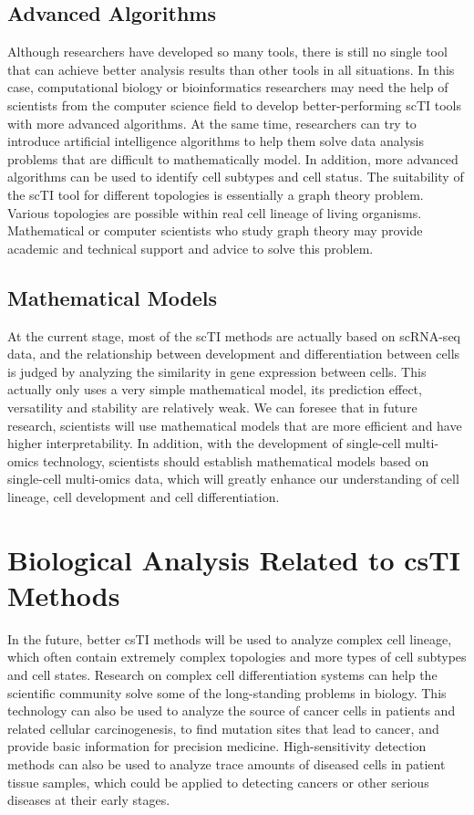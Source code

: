\subsection{Advanced Algorithms}

Although researchers have developed so many tools, there is still no single tool that can achieve better analysis results than other tools in all situations. In this case, computational biology or bioinformatics researchers may need the help of scientists from the computer science field to develop better-performing scTI tools with more advanced algorithms. At the same time, researchers can try to introduce artificial intelligence algorithms to help them solve data analysis problems that are difficult to mathematically model. In addition, more advanced algorithms can be used to identify cell subtypes and cell status. The suitability of the scTI tool for different topologies is essentially a graph theory problem. Various topologies are possible within real cell lineage of living organisms. Mathematical or computer scientists who study graph theory may provide academic and technical support and advice to solve this problem.

\subsection{Mathematical Models}

At the current stage, most of the scTI methods are actually based on scRNA-seq data, and the relationship between development and differentiation between cells is judged by analyzing the similarity in gene expression between cells. This actually only uses a very simple mathematical model, its prediction effect, versatility and stability are relatively weak. We can foresee that in future research, scientists will use mathematical models that are more efficient and have higher interpretability. In addition, with the development of single-cell multi-omics technology, scientists should establish mathematical models based on single-cell multi-omics data, which will greatly enhance our understanding of cell lineage, cell development and cell differentiation.

\section{Biological Analysis Related to csTI Methods}

In the future, better csTI methods will be used to analyze complex cell lineage, which often contain extremely complex topologies and more types of cell subtypes and cell states. Research on complex cell differentiation systems can help the scientific community solve some of the long-standing problems in biology. This technology can also be used to analyze the source of cancer cells in patients and related cellular carcinogenesis, to find mutation sites that lead to cancer, and provide basic information for precision medicine. High-sensitivity detection methods can also be used to analyze trace amounts of diseased cells in patient tissue samples, which could be applied to detecting cancers or other serious diseases at their early stages. \\

